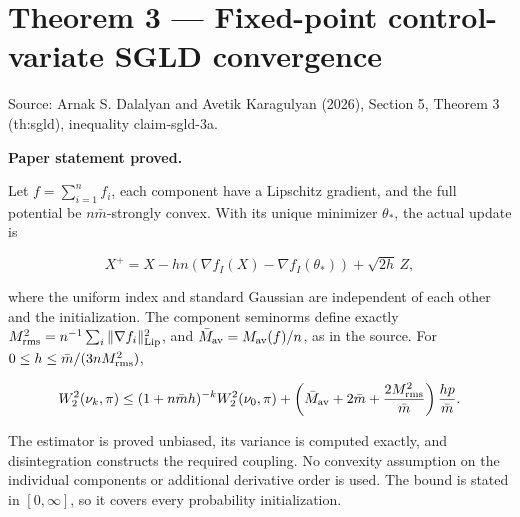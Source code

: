 \documentclass[11pt,a4paper]{report}
\begin{document}
\section{\texorpdfstring{Theorem 3 — Fixed-point control-variate SGLD convergence}{Theorem 3 — Fixed-point control-variate SGLD convergence}}


Source: Arnak S. Dalalyan and Avetik Karagulyan (2026), Section 5, Theorem 3 (th:sgld), inequality claim-sgld-3a.



\textbf{Paper statement proved.}



Let \(f=\sum_{i=1}^n f_i\), each component have a Lipschitz
gradient, and the full potential be \(n\bar m\)-strongly convex. With its
unique minimizer \(\theta_*\), the actual update is


\[X^+=X-hn(\nabla f_I(X)-\nabla f_I(\theta_*))+\sqrt{2h}\,Z,\]


where the uniform index and standard Gaussian are independent of each
other and the initialization. The component seminorms define exactly
\(M_{\rm rms}^2=n^{-1}\sum_i\|\nabla f_i\|_{\rm Lip}^2\), and
\(\bar M_{\rm av}=M_{\rm av}(f)/n\), as in the source. For
\(0\le h\le\bar m/(3nM_{\rm rms}^2)\),


\[W_2^2(\nu_k,\pi)\le(1+n\bar m h)^{-k}W_2^2(\nu_0,\pi)
+\left(\bar M_{\rm av}+2\bar m+
\frac{2M_{\rm rms}^2}{\bar m}\right)\frac{hp}{\bar m}.\]


The estimator is proved unbiased, its variance is computed exactly, and
disintegration constructs the required coupling. No convexity assumption on
the individual components or additional derivative order is used. The
bound is stated in \([0,\infty]\), so it covers every probability
initialization.
\end{document}
